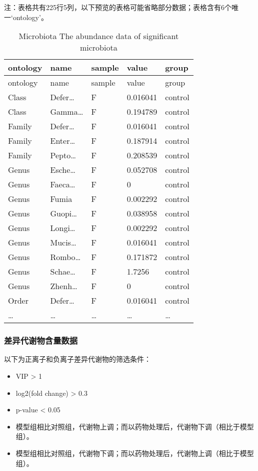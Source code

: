 \documentclass[
]{article}
\providecommand{\tightlist}{%
  \setlength{\itemsep}{0pt}\setlength{\parskip}{0pt}}
\begin{document}
\begin{center}\begin{tcolorbox}[colback=gray!10, colframe=gray!50, width=0.9\linewidth, arc=1mm, boxrule=0.5pt]注：表格共有225行5列，以下预览的表格可能省略部分数据；表格含有6个唯一`ontology'。
\end{tcolorbox}
\end{center}

\begin{longtable}[]{@{}lllll@{}}
\caption{\label{tab:microbiota-The-abundance-data-of-significant-microbiota}Microbiota The abundance data of significant microbiota}\tabularnewline
\toprule
ontology & name & sample & value & group\tabularnewline
\midrule
\endfirsthead
\toprule
ontology & name & sample & value & group\tabularnewline
\midrule
\endhead
Class & Defer\ldots{} & F & 0.016041 & control\tabularnewline
Class & Gamma\ldots{} & F & 0.194789 & control\tabularnewline
Family & Defer\ldots{} & F & 0.016041 & control\tabularnewline
Family & Enter\ldots{} & F & 0.187914 & control\tabularnewline
Family & Pepto\ldots{} & F & 0.208539 & control\tabularnewline
Genus & Esche\ldots{} & F & 0.052708 & control\tabularnewline
Genus & Faeca\ldots{} & F & 0 & control\tabularnewline
Genus & Fumia & F & 0.002292 & control\tabularnewline
Genus & Guopi\ldots{} & F & 0.038958 & control\tabularnewline
Genus & Longi\ldots{} & F & 0.002292 & control\tabularnewline
Genus & Mucis\ldots{} & F & 0.016041 & control\tabularnewline
Genus & Rombo\ldots{} & F & 0.171872 & control\tabularnewline
Genus & Schae\ldots{} & F & 1.7256 & control\tabularnewline
Genus & Zhenh\ldots{} & F & 0 & control\tabularnewline
Order & Defer\ldots{} & F & 0.016041 & control\tabularnewline
\ldots{} & \ldots{} & \ldots{} & \ldots{} & \ldots{}\tabularnewline
\bottomrule
\end{longtable}

\hypertarget{ux5deeux5f02ux4ee3ux8c22ux7269ux542bux91cfux6570ux636e}{%
\subsubsection{差异代谢物含量数据}\label{ux5deeux5f02ux4ee3ux8c22ux7269ux542bux91cfux6570ux636e}}

以下为正离子和负离子差异代谢物的筛选条件：

\begin{itemize}
\tightlist
\item
  VIP \textgreater{} 1
\item
  \textbar log2(fold change)\textbar{} \textgreater{} 0.3
\item
  p-value \textless{} 0.05
\item
  模型组相比对照组，代谢物上调；而以药物处理后，代谢物下调（相比于模型组）。
\item
  模型组相比对照组，代谢物下调；而以药物处理后，代谢物上调（相比于模型组）。
\end{itemize}
\end{document}
